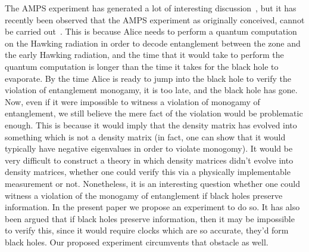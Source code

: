 \documentclass[12pt,a4paper]{article}
\begin{document}
The AMPS experiment has generated a lot of interesting discussion~\cite{marolf2013gauge,giddings2012nonviolent,susskind2012singularities,papadodimas2012infalling,bousso2013complementarity,jacobson2012boundary,banks2013no,almheiri2013apologia,maldacena2013cool,shenker2013black,mathur2013flaw,van2013evaporating,larjo2013black,lloyd2013unitarity}, but it has recently
been observed that the AMPS experiment as originally conceived, cannot be carried out~\cite{harlow2013quantum,susskind2013black}. This is because Alice needs to perform a quantum computation on the Hawking radiation in order to decode entanglement between the zone and the early Hawking radiation, and the time that it would take to perform the quantum computation is longer than the time it takes for the black hole to evaporate. By the time Alice is ready to jump into the black hole to verify the violation of entanglement monogamy, it is too late, and the black hole has gone. Now, even if it were impossible to witness a violation of monogamy of entanglement, we still believe the mere fact of the violation would be problematic enough. This is because it would imply that the density matrix has evolved into something which is not a density matrix (in fact, one can show that it would typically have negative eigenvalues in order to violate monogomy). It would be very difficult to construct a theory in which density matrices didn't evolve into density matrices, whether one could verify this via a physically implementable measurement or not. Nonetheless, it is an interesting question whether one could witness a violation of the monogamy of entanglement if black holes preserve information. In the present paper we propose an experiment to do so. It has also been argued that if black holes preserve information, then it 
may be impossible to verify this, since it would require clocks which are so accurate, they'd form black holes\cite{unruh-newton}. Our proposed experiment circumvents that obstacle as well.
\end{document}
